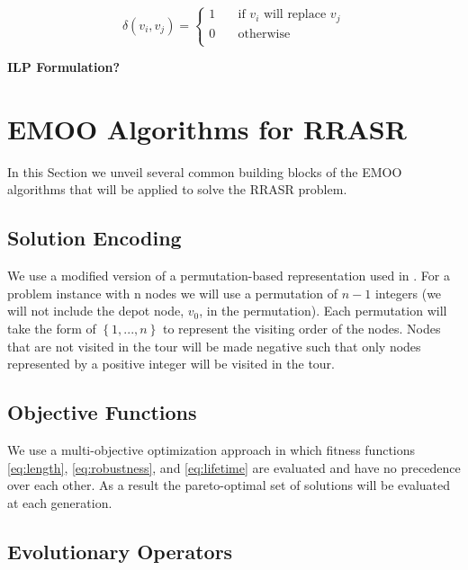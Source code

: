 \documentclass[conference]{IEEEtran}
\begin{document}
\begin{equation} \label {eq:dropoff}
\delta(v_i,v_j) = \left\{ \begin{array}{ll}
1 & \quad \text{if $v_i$ will replace $v_j$} \\
0 & \quad \text{otherwise} \\
\end{array} \right.
\end{equation}

\textbf{ILP Formulation?} \\

\section{EMOO Algorithms for RRASR}
\label{sec:Algorithms}

In this Section we unveil several common building blocks of the EMOO algorithms that will be applied to solve the RRASR problem.

\subsection{Solution Encoding}
\label{sec:Algorithms:Encoding}

We use a modified version of a permutation-based representation used in \cite{liao2010evolutionary}. For a problem instance with n nodes we will use a permutation of $n-1$ integers (we will not include the depot node, $v_0$, in the permutation). Each permutation will take the form of $\left\{ 1,...,n \right\}$ to represent the visiting order of the nodes. Nodes that are not visited in the tour will be made negative such that only nodes represented by a positive integer will be visited in the tour.

\subsection{Objective Functions}
\label{sec:Algorithms:ObjFunctions}

We use a multi-objective optimization approach in which fitness functions \eqref{eq:length}, \eqref{eq:robustness}, and \eqref{eq:lifetime} are evaluated and have no precedence over each other. As a result the pareto-optimal set of solutions will be evaluated at each generation.

\subsection{Evolutionary Operators}
\label{sec:Algorithms:Operators}
\end{document}
